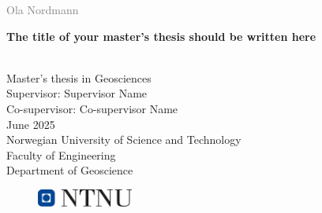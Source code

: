 \documentclass[a4paper, 12pt,oneside]{book} %
\begin{document}


\begin{titlepage}
\vspace*{1.5cm}

\noindent  \textcolor{gray}{\large Ola Nordmann} \\
\vspace{1cm}

\noindent \textbf{\Large The title of your master's thesis should be written here} \\
\vspace{0.5cm}

 \\



\vspace{7cm}
\noindent Master's thesis in Geosciences \\
Supervisor: Supervisor Name \\
Co-supervisor: Co-supervisor Name \\
June 2025 \\

\vspace{0.2cm}
\noindent Norwegian University of Science and Technology \\
Faculty of Engineering \\
Department of Geoscience \\

\begin{figure}[h]
    \includegraphics[width=0.28\textwidth]{Figures/ntnu_basic.png}
\end{figure}
\end{titlepage}
\end{document}
